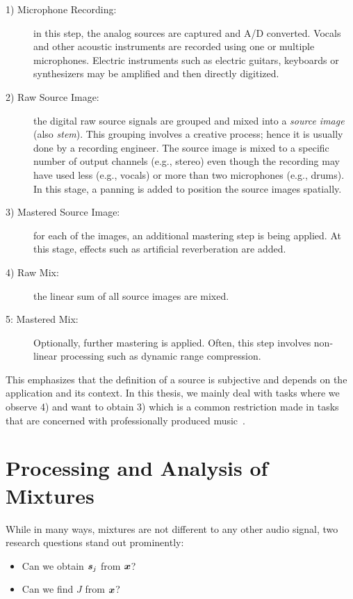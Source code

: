 \begin{description}
  \item[1) Microphone Recording:] in this step, the analog sources are captured and A/D converted. 
  Vocals and other acoustic instruments are recorded using one or multiple microphones.
  Electric instruments such as electric guitars, keyboards or synthesizers may be amplified and then directly digitized.
  \item[2) Raw Source Image:] the digital raw source signals are grouped and mixed into a \emph{source image} (also \emph{stem}).
  This grouping involves a creative process; hence it is usually done by a recording engineer.
  The source image is mixed to a specific number of output channels (e.g., stereo) even though the recording may have used less (e.g., vocals) or more than two microphones (e.g., drums).
  In this stage, a panning is added to position the source images spatially.
  \item[3) Mastered Source Image:] for each of the images, an additional mastering step is being applied.
  At this stage, effects such as artificial reverberation are added.
  \item[4) Raw Mix:] the linear sum of all source images are mixed.
  \item[5: Mastered Mix:] Optionally, further mastering is applied.
  Often, this step involves non-linear processing such as dynamic range compression.
\end{description}

This emphasizes that the definition of a source is subjective and depends on the application and its context. In this thesis, we mainly deal with tasks where we observe 4) and want to obtain 3) which is a common restriction made in tasks that are concerned with professionally produced music~\cite{sisec16}.

\hypertarget{processing-and-analysis-of-mixtures}{%
\section{Processing and Analysis of Mixtures}\label{sec:processing-and-analysis-of-mixtures}}

While in many ways, mixtures are not different to any other audio signal, two research questions stand out prominently:

\begin{itemize}
    \item Can we obtain \({\bm{s}}_j\) from \({\bm{x}}\)? 
    \item Can we find \(J\) from \({\bm{x}}\)?
\end{itemize}

